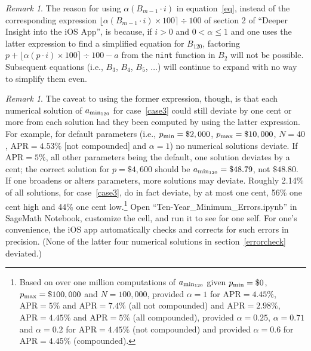 \documentclass[12pt,letterpaper,oneside]{article}
\theoremstyle{remark} %
\newtheorem{remark}[theorem]{Remark}
\begin{document}
	\newpage
	\begin{remark}
	The reason for using $\alpha\left(B_{m-1}\cdot i\right)$ in equation~\ref{eq}, instead of the corresponding expression $\big\lfloor{\alpha\left(B_{m-1}\cdot i\right)\times 100}\big\rceil\div 100$ of section 2 of ``Deeper Insight into the iOS App'', is because, if $i>0$ and $0<\alpha\leq1$ and one uses the latter expression to find a simplified equation for $B_{120}$, factoring $p+\big\lfloor{\alpha\left(p\cdot i\right)\times 100}\big\rceil\div 100-a$ from the \texttt{nint} function in $B_{2}$ will not be possible. Subsequent equations (i.e., $B_{3}$, $B_{4}$, $B_{5}$, $\dots$) will continue to expand with no way to simplify them even.
	\end{remark}
	
	\vspace{12pt}
	\begin{remark} The caveat to using the former expression, though, is that each numerical solution of $a_{\rm{min_{120}}}$ for case~\ref{case3} could still deviate by one cent or more from each solution had they been computed by using the latter expression. For example, for default parameters (i.e., $p_{\rm{min}}=\$2,000$, $p_{\rm{max}}=\$10,000$, $N=40$, $\mbox{APR}=4.53\%$ [not compounded] and $\alpha =1$) no numerical solutions deviate. If $\mbox{APR}=5\%$, all other parameters being the default, one solution deviates by a cent; the correct solution for $p=\$4,600$ should be $a_{\rm{min_{120}}}=\$48.79$, not $\$48.80$. If one broadens or alters parameters, more solutions may deviate. Roughly 2.14\% of all solutions, for case~\ref{case3}, do in fact deviate, by at most one cent, 56\% one cent high and 44\% one cent low.\footnote{Based on over one million computations of $a_{\rm{min_{120}}}$ given $p_{\rm{min}}=\$0$, $p_{\rm{max}}=\$100,000$ and $N=100,000$, provided $\alpha =1$ for $\mbox{APR}=4.45\%$, $\mbox{APR}=5\%$ and $\mbox{APR}=7.4\%$ (all not compounded) and $\mbox{APR}=2.98\%$, $\mbox{APR}=4.45\%$ and $\mbox{APR}=5\%$ (all compounded), provided $\alpha =0.25$, $\alpha =0.71$ and $\alpha =0.2$ for $\mbox{APR}=4.45\%$ (not compounded) and provided $\alpha =0.6$ for $\mbox{APR}=4.45\%$ (compounded).} Open ``Ten-Year\_Minimum\_Errors.ipynb'' in SageMath Notebook, customize the cell, and run it to see for one self. For one's convenience, the iOS app automatically checks and corrects for such errors in precision. (None of the latter four numerical solutions in section~\ref{errorcheck} deviated.)
	\end{remark}	
\end{document}
